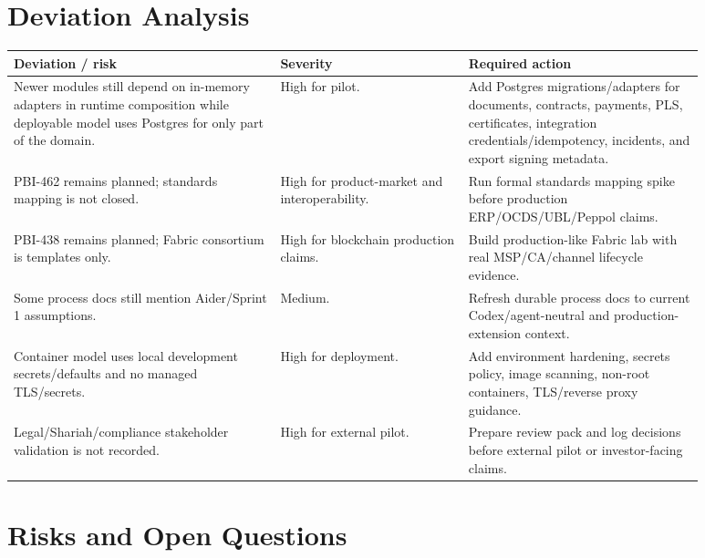 \documentclass[11pt,a4paper]{article}
\begin{document}
\section{Deviation Analysis}

\begin{longtable}{P{0.34\linewidth}P{0.24\linewidth}P{0.30\linewidth}}
\toprule
Deviation / risk & Severity & Required action \\
\midrule
Newer modules still depend on in-memory adapters in runtime composition while deployable model uses Postgres for only part of the domain. & High for pilot. & Add Postgres migrations/adapters for documents, contracts, payments, PLS, certificates, integration credentials/idempotency, incidents, and export signing metadata. \\
PBI-462 remains planned; standards mapping is not closed. & High for product-market and interoperability. & Run formal standards mapping spike before production ERP/OCDS/UBL/Peppol claims. \\
PBI-438 remains planned; Fabric consortium is templates only. & High for blockchain production claims. & Build production-like Fabric lab with real MSP/CA/channel lifecycle evidence. \\
Some process docs still mention Aider/Sprint 1 assumptions. & Medium. & Refresh durable process docs to current Codex/agent-neutral and production-extension context. \\
Container model uses local development secrets/defaults and no managed TLS/secrets. & High for deployment. & Add environment hardening, secrets policy, image scanning, non-root containers, TLS/reverse proxy guidance. \\
Legal/Shariah/compliance stakeholder validation is not recorded. & High for external pilot. & Prepare review pack and log decisions before external pilot or investor-facing claims. \\
\bottomrule
\end{longtable}

\section{Risks and Open Questions}
\end{document}
